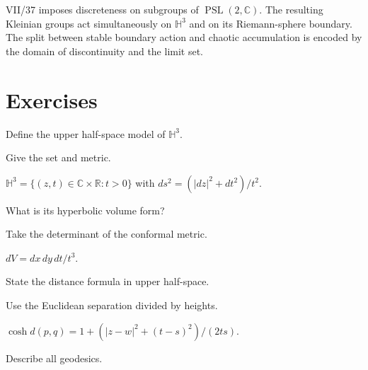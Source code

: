 VII/37 imposes discreteness on subgroups of \(\operatorname{PSL}(2,\mathbb C)\).  The resulting Kleinian groups act simultaneously on \(\mathbb H^3\) and on its Riemann-sphere boundary.  The split between stable boundary action and chaotic accumulation is encoded by the domain of discontinuity and the limit set.

\section{Exercises}

\begin{exercise}\label{exr:vii36-01}
Define the upper half-space model of \(\mathbb H^3\).
\end{exercise}

\begin{hint}
Give the set and metric.
\end{hint}

\begin{solution}
\(\mathbb H^3=\{(z,t)\in\mathbb C\times\mathbb R:t>0\}\) with \(ds^2=(|dz|^2+dt^2)/t^2\).
\end{solution}

\begin{exercise}\label{exr:vii36-02}
What is its hyperbolic volume form?
\end{exercise}

\begin{hint}
Take the determinant of the conformal metric.
\end{hint}

\begin{solution}
\(dV=dx\,dy\,dt/t^3\).
\end{solution}

\begin{exercise}\label{exr:vii36-03}
State the distance formula in upper half-space.
\end{exercise}

\begin{hint}
Use the Euclidean separation divided by heights.
\end{hint}

\begin{solution}
\(\cosh d(p,q)=1+(|z-w|^2+(t-s)^2)/(2ts)\).
\end{solution}

\begin{exercise}\label{exr:vii36-04}
Describe all geodesics.
\end{exercise}

